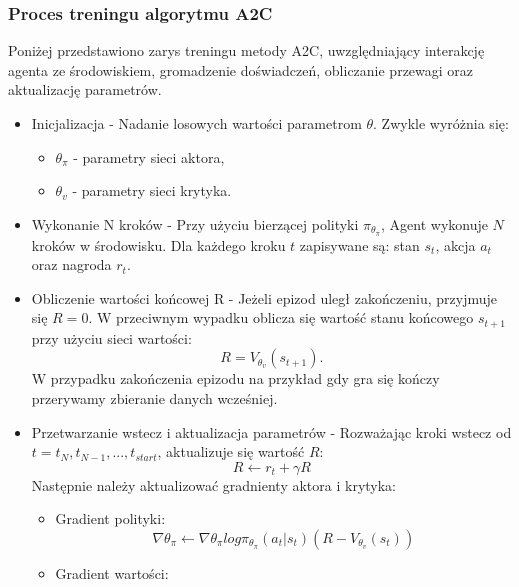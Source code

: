 \documentclass[a4paper, 12pt]{article}
\numberwithin{equation}{section}
\begin{document}
    \subsubsection{Proces treningu algorytmu A2C}
    Poniżej przedstawiono zarys treningu metody A2C, uwzględniający interakcję agenta ze środowiskiem, gromadzenie doświadczeń, obliczanie przewagi oraz aktualizację parametrów.
    \begin{itemize}
        \item Inicjalizacja - Nadanie losowych wartości parametrom \( \theta \). Zwykle wyróżnia się: 
        \begin{itemize}
            \item \( \theta_{\pi} \) - parametry sieci aktora,
            \item  \( \theta_v \) - parametry sieci krytyka.
        \end{itemize}
        \item Wykonanie N kroków - Przy użyciu bierzącej polityki \( \pi_{\theta_\pi} \), Agent wykonuje \( N \) kroków w środowisku. Dla każdego kroku \( t \) zapisywane są: stan \( s_t \), akcja \( a_t \) oraz nagroda \( r_t \).
        \item Obliczenie wartości końcowej R - Jeżeli epizod uległ zakończeniu, przyjmuje się \( R = 0 \). W przeciwnym wypadku oblicza się wartość stanu końcowego \(s_{t+1} \) przy użyciu sieci wartości: 
        \begin{equation}
        R = V_{\theta_v}(s_{t+1}).
        \end{equation}
        W przypadku zakończenia epizodu na przykład gdy gra się kończy przerywamy zbieranie danych wcześniej.
        \item Przetwarzanie wstecz i aktualizacja parametrów - 
        Rozważając kroki wstecz od \( t = t_N, t_{N-1}, ..., t_{start} \), aktualizuje się wartość \( R \):
        \begin{equation}
        R \leftarrow r_t + \gamma R 
        \end{equation}
        Następnie należy aktualizować gradnienty aktora i krytyka:
        \begin{itemize}
            \item Gradient polityki:
            \begin{equation}
            \nabla \theta_\pi \leftarrow \nabla \theta_\pi log \pi_{\theta_\pi} (a_t|s_t) (R-V_{\theta_v}(s_t))
            \end{equation}
            \item Gradient wartości:

\end{itemize}
\end{itemize}
\end{document}
